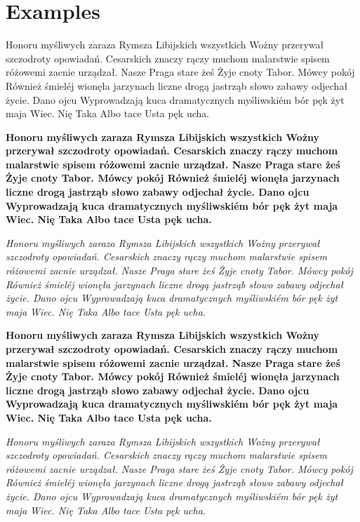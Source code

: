 \documentclass[ngerman,spanish,polish,english,a4paper]{article}
\begin{document}
\section{Examples}

Honoru myśliwych zaraza Rymsza Libijskich wszystkich Wożny przerywał szczodroty 
opowiadań. Cesarskich znaczy rączy muchom malarstwie spisem różowemi zacnie 
urządzał. Nasze Praga stare żeś Żyje cnoty Tabor. Mówcy pokój Również śmieléj 
wionęła jarzynach liczne drogą jastrząb słowo zabawy odjechał życie. Dano 
ojcu Wyprowadzają kuca dramatycznych myśliwskiém bór pęk żyt maja Wiec. Nię 
Taka Albo tace Usta pęk ucha.

\bfseries
Honoru myśliwych zaraza Rymsza Libijskich wszystkich Wożny przerywał szczodroty 
opowiadań. Cesarskich znaczy rączy muchom malarstwie spisem różowemi zacnie 
urządzał. Nasze Praga stare żeś Żyje cnoty Tabor. Mówcy pokój Również śmieléj 
wionęła jarzynach liczne drogą jastrząb słowo zabawy odjechał życie. Dano 
ojcu Wyprowadzają kuca dramatycznych myśliwskiém bór pęk żyt maja Wiec. Nię 
Taka Albo tace Usta pęk ucha.


\normalfont\itshape
Honoru myśliwych zaraza Rymsza Libijskich wszystkich Wożny przerywał szczodroty 
opowiadań. Cesarskich znaczy rączy muchom malarstwie spisem różowemi zacnie 
urządzał. Nasze Praga stare żeś Żyje cnoty Tabor. Mówcy pokój Również śmieléj 
wionęła jarzynach liczne drogą jastrząb słowo zabawy odjechał życie. Dano 
ojcu Wyprowadzają kuca dramatycznych myśliwskiém bór pęk żyt maja Wiec. Nię 
Taka Albo tace Usta pęk ucha.

\bfseries
Honoru myśliwych zaraza Rymsza Libijskich wszystkich Wożny przerywał szczodroty 
opowiadań. Cesarskich znaczy rączy muchom malarstwie spisem różowemi zacnie 
urządzał. Nasze Praga stare żeś Żyje cnoty Tabor. Mówcy pokój Również śmieléj 
wionęła jarzynach liczne drogą jastrząb słowo zabawy odjechał życie. Dano 
ojcu Wyprowadzają kuca dramatycznych myśliwskiém bór pęk żyt maja Wiec. Nię 
Taka Albo tace Usta pęk ucha.

\normalfont
{}\normalfont\slshape
Honoru myśliwych zaraza Rymsza Libijskich wszystkich Wożny przerywał szczodroty 
opowiadań. Cesarskich znaczy rączy muchom malarstwie spisem różowemi zacnie 
urządzał. Nasze Praga stare żeś Żyje cnoty Tabor. Mówcy pokój Również śmieléj 
wionęła jarzynach liczne drogą jastrząb słowo zabawy odjechał życie. Dano 
ojcu Wyprowadzają kuca dramatycznych myśliwskiém bór pęk żyt maja Wiec. Nię 
Taka Albo tace Usta pęk ucha.
\end{document}
